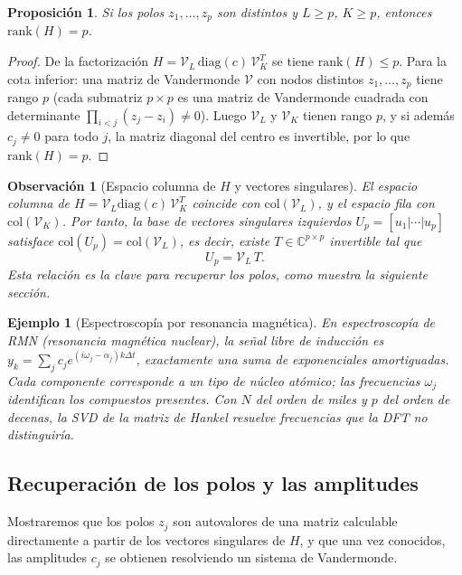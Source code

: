 \documentclass[12pt]{article}
\newtheorem{proposition}[theorem]{Proposición}
\newtheorem{example}[theorem]{Ejemplo}
\newtheorem{remark}[theorem]{Observación}
\newcommand{\C}{\mathbb{C}}
\newcommand{\rank}{\mathrm{rank}}
\begin{document}
\begin{proposition}
Si los polos $z_1, \ldots, z_p$ son distintos y $L \geq p$, $K \geq p$, entonces $\rank(H) = p$.
\end{proposition}
\begin{proof}
De la factorización $H = \mathcal{V}_L \,\mathrm{diag}(c)\, \mathcal{V}_K^T$ se tiene $\rank(H) \leq p$. Para la cota inferior: una matriz de Vandermonde $\mathcal{V}$ con nodos distintos $z_1, \ldots, z_p$ tiene rango $p$ (cada submatriz $p \times p$ es una matriz de Vandermonde cuadrada con determinante $\prod_{i < j}(z_j - z_i) \neq 0$). Luego $\mathcal{V}_L$ y $\mathcal{V}_K$ tienen rango $p$, y si además $c_j \neq 0$ para todo $j$, la matriz diagonal del centro es invertible, por lo que $\rank(H) = p$.
\end{proof}

\begin{remark}[Espacio columna de $H$ y vectores singulares]
El espacio columna de $H = \mathcal{V}_L \mathrm{diag}(c)\, \mathcal{V}_K^T$ coincide con $\mathrm{col}(\mathcal{V}_L)$, y el espacio fila con $\mathrm{col}(\mathcal{V}_K)$. Por tanto, la base de vectores singulares izquierdos $U_p = [u_1|\cdots|u_p]$ satisface $\mathrm{col}(U_p) = \mathrm{col}(\mathcal{V}_L)$, es decir, existe $T \in \C^{p\times p}$ invertible tal que
\[
  U_p = \mathcal{V}_L\, T.
\]
Esta relación es la clave para recuperar los polos, como muestra la siguiente sección.
\end{remark}

\begin{example}[Espectroscopía por resonancia magnética]
En espectroscopía de RMN (resonancia magnética nuclear), la señal libre de inducción es $y_k = \sum_j c_j e^{(i\omega_j - \alpha_j)k\Delta t}$, exactamente una suma de exponenciales amortiguadas. Cada componente corresponde a un tipo de núcleo atómico; las frecuencias $\omega_j$ identifican los compuestos presentes. Con $N$ del orden de miles y $p$ del orden de decenas, la SVD de la matriz de Hankel resuelve frecuencias que la DFT no distinguiría.
\end{example}

\subsection{Recuperación de los polos y las amplitudes}

Mostraremos que los polos $z_j$ son autovalores de una matriz calculable directamente a partir de los vectores singulares de $H$, y que una vez conocidos, las amplitudes $c_j$ se obtienen resolviendo un sistema de Vandermonde.
\end{document}
